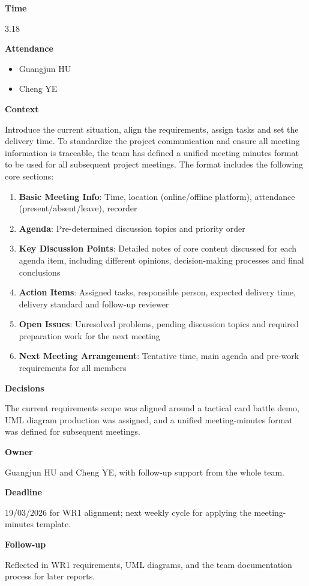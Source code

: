 \documentclass[12pt,a4paper]{report}
\begin{document}
\textbf{Time}

3.18

\textbf{Attendance}

\begin{itemize}
\item Guangjun HU
\item Cheng YE
\end{itemize}

\textbf{Context}

Introduce the current situation, align the requirements, assign tasks and set the delivery time. To standardize the project communication and ensure all meeting information is traceable, the team has defined a unified meeting minutes format to be used for all subsequent project meetings. The format includes the following core sections:

\begin{enumerate}
\item \textbf{Basic Meeting Info}: Time, location (online/offline platform), attendance (present/absent/leave), recorder
\item \textbf{Agenda}: Pre-determined discussion topics and priority order
\item \textbf{Key Discussion Points}: Detailed notes of core content discussed for each agenda item, including different opinions, decision-making processes and final conclusions
\item \textbf{Action Items}: Assigned tasks, responsible person, expected delivery time, delivery standard and follow-up reviewer
\item \textbf{Open Issues}: Unresolved problems, pending discussion topics and required preparation work for the next meeting
\item \textbf{Next Meeting Arrangement}: Tentative time, main agenda and pre-work requirements for all members
\end{enumerate}

\textbf{Decisions}

The current requirements scope was aligned around a tactical card battle demo, UML diagram production was assigned, and a unified meeting-minutes format was defined for subsequent meetings.

\textbf{Owner}

Guangjun HU and Cheng YE, with follow-up support from the whole team.

\textbf{Deadline}

19/03/2026 for WR1 alignment; next weekly cycle for applying the meeting-minutes template.

\textbf{Follow-up}

Reflected in WR1 requirements, UML diagrams, and the team documentation process for later reports.
\end{document}
